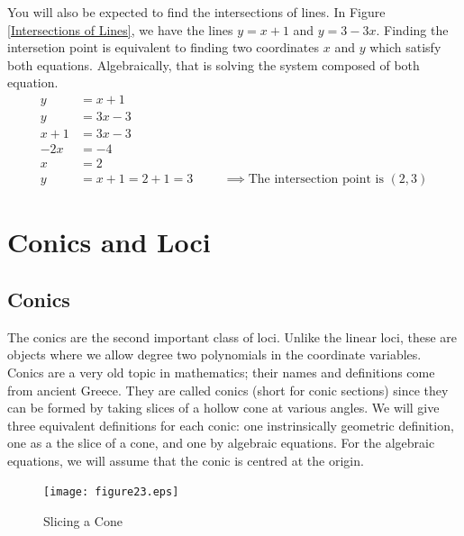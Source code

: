 \documentclass[fleqn]{report}
\begin{document}
You will also be expected to find the intersections of lines.
In Figure \ref{Intersections of Lines}, we have the lines
$y=x+1$ and $y=3-3x$. Finding the intersetion point is
equivalent to finding two coordinates $x$ and $y$ which
satisfy both equations. Algebraically, that is solving the
system composed of both equation.
\begin{align*}
y & = x+1 \\
y & = 3x-3 \\
x+1 & = 3x-3 \\
-2x & = -4 \\
x & = 2 \\
y & = x+1 = 2+1 = 3 \hspace{1cm} \implies \text{The
intersection point is $(2,3)$}
\end{align*}

\chapter{Conics and Loci}
\label{Conics and Loci}

\section*{Conics}

The conics are the second important class of loci. Unlike
the linear loci, these are objects where we allow degree two
polynomials in the coordinate variables. Conics are a very
old topic in mathematics; their names and definitions come
from ancient Greece. They are called conics (short for conic
sections) since they can be formed by taking slices of a
hollow cone at various angles. We will give three equivalent
definitions for each conic: one instrinsically geometric
definition, one as a the slice of a cone, and one by algebraic
equations. For the algebraic equations, we will assume that
the conic is centred at the origin.

\begin{figure}[ht]
\centering
\texttt{[image: figure23.eps]}
\caption{Slicing a Cone}
\label{Slicing a Cone}
\end{figure}
\clearpage
\end{document}
